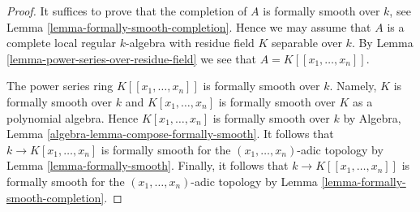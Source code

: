 \documentclass[10pt,a4paper]{amsart}
\theoremstyle{plain}
\theoremstyle{definition}
\theoremstyle{remark}
\numberwithin{equation}{subsection}
\begin{document}
\begin{proof}
It suffices to prove that the completion of $A$ is formally
smooth over $k$, see Lemma \ref{lemma-formally-smooth-completion}.
Hence we may assume that $A$ is a complete local regular $k$-algebra
with residue field $K$ separable over $k$.
By Lemma \ref{lemma-power-series-over-residue-field} we see that
$A = K[[x_1, \ldots, x_n]]$.

\medskip\noindent
The power series ring $K[[x_1, \ldots, x_n]]$ is formally
smooth over $k$. Namely, $K$ is formally smooth over $k$ and
$K[x_1, \ldots, x_n]$ is formally smooth over $K$ as a polynomial algebra.
Hence $K[x_1, \ldots, x_n]$ is formally smooth over $k$ by
Algebra, Lemma \ref{algebra-lemma-compose-formally-smooth}.
It follows that $k \to K[x_1, \ldots, x_n]$ is formally smooth
for the $(x_1, \ldots, x_n)$-adic topology by
Lemma \ref{lemma-formally-smooth}.
Finally, it follows that $k \to K[[x_1, \ldots, x_n]]$ is formally
smooth for the $(x_1, \ldots, x_n)$-adic topology by
Lemma \ref{lemma-formally-smooth-completion}.
\end{proof}
\end{document}
